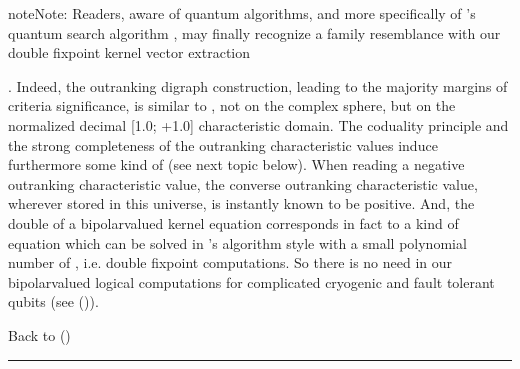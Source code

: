 \documentclass[a4paper,12pt,english]{sphinxhowto}
\begin{document}
\begin{sphinxadmonition}{note}{Note:}
\sphinxAtStartPar
Readers, aware of quantum algorithms, and more specifically of ’s quantum search algorithm , may finally recognize a family resemblance with our double fixpoint kernel vector extraction %
\begin{footnote}[27]\sphinxAtStartFootnote
{}
%
\end{footnote}. Indeed, the outranking digraph construction, leading to the majority margins of criteria significance, is similar to , not on the complex  sphere, but on the normalized decimal {[}\sphinxhyphen{}1.0; +1.0{]} characteristic domain. The coduality principle and the strong completeness of the outranking characteristic values induce furthermore some kind of  (see next topic below). When reading a negative outranking characteristic value, the converse outranking characteristic value, wherever stored in this universe, is instantly known to be positive. And, the double of a bipolar\sphinxhyphen{}valued kernel equation corresponds in fact to a kind of  equation which can be solved in ’s algorithm style with a small polynomial number of , i.e. double fixpoint computations. So there is no need in our bipolar\sphinxhyphen{}valued logical computations for complicated cryogenic and fault tolerant qubits (see {\hyperref[\detokenize{pearls:bipolar-valued-sets-tutorial-label}]{}} ()).
\end{sphinxadmonition}

\sphinxAtStartPar
Back to {\hyperref[\detokenize{pearls:pearls-label}]{}} ()


\bigskip\hrule\bigskip
\end{document}
